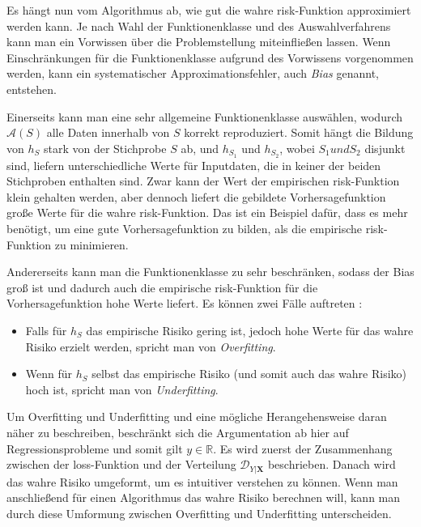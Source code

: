 Es h\"angt nun vom Algorithmus ab, wie gut die wahre risk-Funktion approximiert werden kann. Je nach Wahl der Funktionenklasse und des
Auswahlverfahrens kann man ein Vorwissen \"uber die Problemstellung miteinflie{\ss}en lassen. Wenn Einschr\"ankungen f\"ur die
Funktionenklasse aufgrund des Vorwissens vorgenommen werden, kann ein systematischer Approximationsfehler, auch \textit{Bias} genannt, entstehen.

Einerseits kann man eine sehr allgemeine Funktionenklasse ausw\"ahlen, wodurch $\mathcal{A}(S)$ alle Daten innerhalb von $S$ korrekt reproduziert. Somit
h\"angt die Bildung von $h_S$ stark von der Stichprobe $S$ ab, und $h_{S_1}$ und $h_{S_2}$, wobei $S_1 und S_2$ disjunkt sind, liefern unterschiedliche Werte f\"ur Inputdaten,
die in keiner der beiden Stichproben enthalten sind. Zwar kann der Wert der empirischen risk-Funktion klein gehalten werden, aber dennoch liefert die gebildete
Vorhersagefunktion gro{\ss}e Werte f\"ur die wahre risk-Funktion. Das ist ein Beispiel daf\"ur, dass es mehr ben\"otigt, um eine gute Vorhersagefunktion zu bilden, als
die empirische risk-Funktion zu minimieren.

Andererseits kann man die Funktionenklasse zu sehr beschr\"anken, sodass der Bias gro{\ss} ist und dadurch auch die empirische risk-Funktion f\"ur die
Vorhersagefunktion hohe Werte liefert. Es k\"onnen zwei F\"alle auftreten \cite[Seite 374]{strang}:
\begin{itemize}
	\item Falls f\"ur $h_S$ das empirische Risiko gering ist, jedoch hohe Werte f\"ur das wahre Risiko erzielt werden, spricht man von \textit{Overfitting}.
	\item Wenn f\"ur $h_S$ selbst das empirische Risiko (und somit auch das wahre Risiko) hoch ist, spricht man von \textit{Underfitting}.
\end{itemize}

Um Overfitting und Underfitting und eine m\"ogliche Herangehensweise daran n\"aher zu beschreiben, beschr\"ankt sich die Argumentation ab hier auf Regressionsprobleme und somit gilt
$y \in \mathbb{R}$. Es wird zuerst der Zusammenhang zwischen der loss-Funktion und der Verteilung $\mathcal{D}_{Y|\mathbf{X}}$ beschrieben. Danach
wird das wahre Risiko umgeformt, um es intuitiver verstehen zu k\"onnen. Wenn man anschlie{\ss}end f\"ur einen Algorithmus das wahre Risiko berechnen will,
kann man durch diese Umformung zwischen Overfitting und Underfitting unterscheiden.


